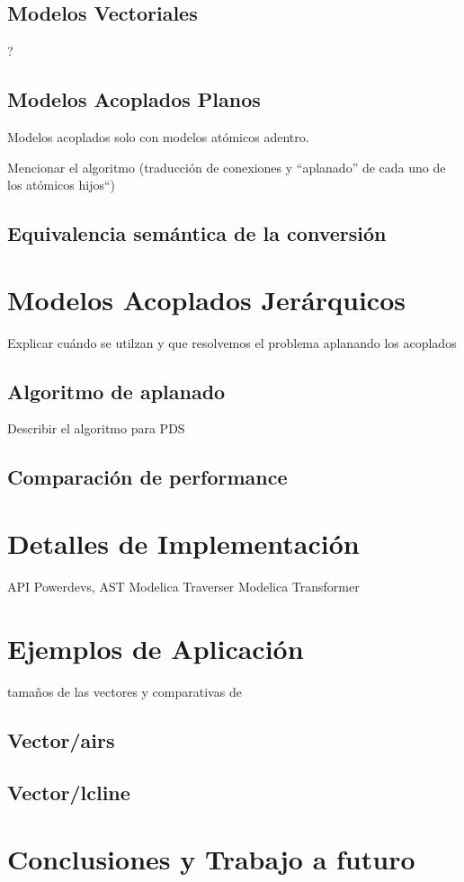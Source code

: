 \documentclass[a4paper,	11pt]{article}
\begin{document}
\subsection{Modelos Vectoriales}
?

\subsection{Modelos Acoplados Planos}
Modelos acoplados solo con modelos atómicos adentro.

Mencionar el algoritmo (traducción de conexiones y ``aplanado'' de cada uno de los atómicos hijos``)	

\subsection{Equivalencia semántica de la conversión}

\section{Modelos Acoplados Jerárquicos}
Explicar cuándo se utilzan y que resolvemos el problema aplanando los acoplados

\subsection{Algoritmo de aplanado}
Describir el algoritmo para PDS


\subsection{Comparación de performance}

\section{Detalles de Implementación}
API Powerdevs, AST Modelica
Traverser
Modelica Transformer


\section{Ejemplos de Aplicación}
tamaños de las vectores y comparativas de 
\subsection{Vector/airs}
\subsection{Vector/lcline}

\section{Conclusiones y Trabajo a futuro}


\begin{small}

\end{small}
\end{document}
